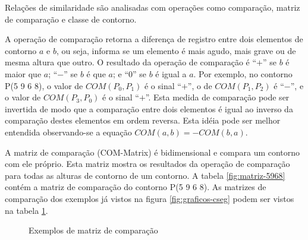 Relações de similaridade \cite{marvin.ea87:relating} são analisadas
com operações como comparação, matriz de comparação e classe de
contorno.

A operação de comparação  retorna a diferença de registro
entre dois elementos de contorno $a$ e $b$, ou seja, informa se um
elemento é mais agudo, mais grave ou de mesma altura que outro. O
resultado da operação de comparação é ``$+$'' se $b$ é maior que $a$;
``$-$'' se $b$ é que $a$; e ``$0$'' se $b$ é igual a $a$. Por exemplo,
no contorno P(5 9 6 8), o valor de $COM(P_0,P_1)$ é o sinal ``$+$'', o
de $COM(P_1,P_2)$ é ``$-$'', e o valor de $COM(P_3,P_0)$ é o sinal
``$+$''. Esta medida de comparação pode ser invertida de modo que a
comparação entre dois elementos é igual ao inverso da comparação
destes elementos em ordem reversa. Esta idéia pode ser melhor
entendida observando-se a equação $COM(a,b)=-COM(b,a)$.

A matriz de comparação (COM-Matrix) é bidimensional e compara um
contorno com ele próprio. Esta matriz mostra os resultados da operação
de comparação para todas as alturas de contorno de um contorno. A
tabela \ref{fig:matriz-5968} contém a matriz de comparação do contorno
P(5 9 6 8). As matrizes de comparação dos exemplos já vistos na figura
\ref{fig:graficos-cseg} podem ser vistos na tabela
\ref{fig:matriz-exemplos}.

\begin{figure}
  \centering
  \qquad
  \qquad
  \caption{Exemplos de matriz de comparação}
  \label{fig:matriz-exemplos}
\end{figure}

